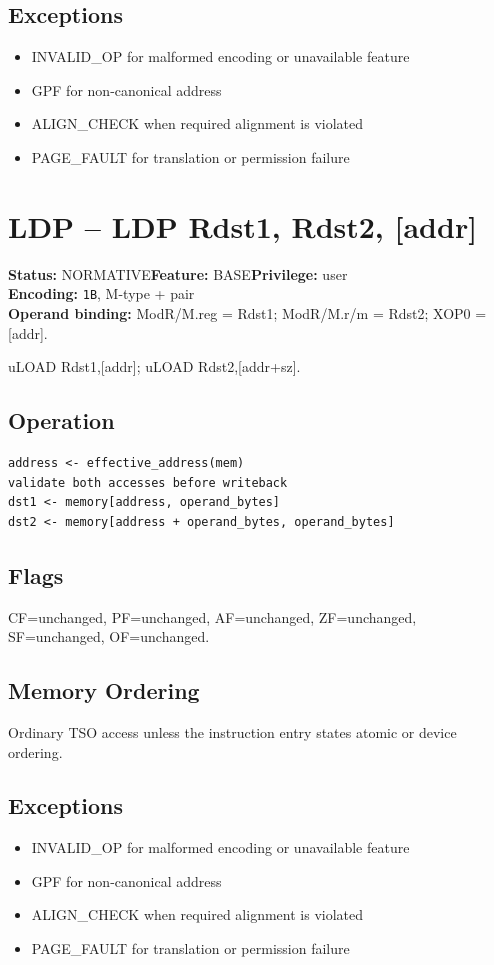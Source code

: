 \documentclass[10pt]{article}
\begin{document}
\subsection*{Exceptions}
\begin{itemize}
\item INVALID\_OP for malformed encoding or unavailable feature
\item GPF for non-canonical address
\item ALIGN\_CHECK when required alignment is violated
\item PAGE\_FAULT for translation or permission failure
\end{itemize}
\clearpage

\section{LDP -- LDP Rdst1, Rdst2, [addr]}
\textbf{Status:} NORMATIVE\quad \textbf{Feature:} BASE\quad \textbf{Privilege:} user\\
\textbf{Encoding:} \texttt{1B}, M-type + pair\\
\textbf{Operand binding:} ModR/M.reg = Rdst1; ModR/M.r/m = Rdst2; XOP0 = [addr].

uLOAD Rdst1,[addr]; uLOAD Rdst2,[addr+sz].

\subsection*{Operation}
\begin{lstlisting}
address <- effective_address(mem)
validate both accesses before writeback
dst1 <- memory[address, operand_bytes]
dst2 <- memory[address + operand_bytes, operand_bytes]
\end{lstlisting}
\subsection*{Flags}
CF=unchanged, PF=unchanged, AF=unchanged, ZF=unchanged, SF=unchanged, OF=unchanged.
\subsection*{Memory Ordering}
Ordinary TSO access unless the instruction entry states atomic or device ordering.
\subsection*{Exceptions}
\begin{itemize}
\item INVALID\_OP for malformed encoding or unavailable feature
\item GPF for non-canonical address
\item ALIGN\_CHECK when required alignment is violated
\item PAGE\_FAULT for translation or permission failure
\end{itemize}
\clearpage
\end{document}
